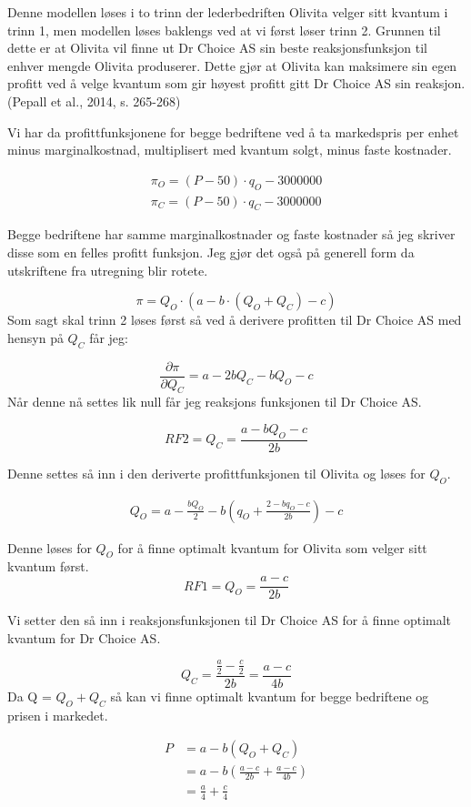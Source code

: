 \documentclass[
  12pt,
  a4paper,
  DIV=11,
  numbers=noendperiod]{scrartcl}
\begin{document}
Denne modellen løses i to trinn der lederbedriften Olivita velger sitt
kvantum i trinn 1, men modellen løses baklengs ved at vi først løser
trinn 2. Grunnen til dette er at Olivita vil finne ut Dr Choice AS sin
beste reaksjonsfunksjon til enhver mengde Olivita produserer. Dette gjør
at Olivita kan maksimere sin egen profitt ved å velge kvantum som gir
høyest profitt gitt Dr Choice AS sin reaksjon. (Pepall et al., 2014, s.
265-268)

Vi har da profittfunksjonene for begge bedriftene ved å ta markedspris
per enhet minus marginalkostnad, multiplisert med kvantum solgt, minus
faste kostnader.

\begin{align*}
\pi_O=(P-50) \cdot q_O-3000000 \\
\pi_C=(P-50) \cdot q_C-3000000
\end{align*}

Begge bedriftene har samme marginalkostnader og faste kostnader så jeg
skriver disse som en felles profitt funksjon. Jeg gjør det også på
generell form da utskriftene fra utregning blir rotete.

\[
\pi = Q_O \cdot (a - b \cdot (Q_O + Q_C) - c) 
\] Som sagt skal trinn 2 løses først så ved å derivere profitten til Dr
Choice AS med hensyn på \(Q_C\) får jeg:

\[
\frac{\partial \pi}{\partial Q_C} = a- 2bQ_C - bQ_O -c
\] Når denne nå settes lik null får jeg reaksjons funksjonen til Dr
Choice AS.

\[
RF2 = Q_C= \frac{a-bQ_O - c}{2b}
\]

Denne settes så inn i den deriverte profittfunksjonen til Olivita og
løses for \(Q_O\).

\begin{align*}
Q_O = a-\frac{b Q_O}{2} - b \left(q_O + \frac{2-b q_O - c}{2b}\right)-c
\end{align*}

Denne løses for \(Q_O\) for å finne optimalt kvantum for Olivita som
velger sitt kvantum først. \[
RF1 = Q_O = \frac{a-c}{2b}
\]

Vi setter den så inn i reaksjonsfunksjonen til Dr Choice AS for å finne
optimalt kvantum for Dr Choice AS.

\[
Q_C = \frac{\frac{a}{2}-\frac{c}{2}}{2b} = \frac{a-c}{4b}
\] Da Q = \(Q_O + Q_C\) så kan vi finne optimalt kvantum for begge
bedriftene og prisen i markedet.

\begin{align*}
P &= a - b(Q_O + Q_C) \\
&= a- b(\frac{a-c}{2b} + \frac{a- c}{4b}) \\
&= \frac{a}{4} + \frac{c}{4}
\end{align*}
\end{document}
